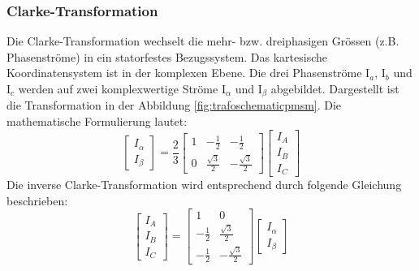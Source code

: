 \subsubsection*{Clarke-Transformation}
Die Clarke-Transformation wechselt die mehr- bzw. dreiphasigen Grössen (z.B. Phasenströme) in ein statorfestes Bezugssystem. Das kartesische Koordinatensystem ist in der komplexen Ebene. Die drei Phasenströme I$_{a}$, I$_{b}$ und I$_{c}$ werden auf zwei komplexwertige Ströme I$_{\alpha}$ und I$_{\beta}$ abgebildet. Dargestellt ist die Transformation in der Abbildung \ref{fig:trafoschematicpmsm}.
Die mathematische Formulierung lautet:
\begin{equation}\label{ClarkeTrafo}
\left[
\begin{array}{c}
I_\alpha \\ 
I_\beta
\end{array} 
\right]
= \frac{2}{3}
\left[
\begin{array}{ccc}
1 & -\frac{1}{2} & -\frac 12 \\ 
0 & \frac{\sqrt{3}}{2} & -\frac{\sqrt{3}}{2}
\end{array} 
\right] 
\left[
\begin{array}{c}
I_A \\ 
I_B \\
I_C
\end{array} 
\right]
\end{equation}
Die inverse Clarke-Transformation wird entsprechend durch folgende Gleichung beschrieben:
\begin{equation}\label{invClarkeTrafo}
\left[
\begin{array}{c}
I_A \\ 
I_B \\
I_C
\end{array} 
\right]
= 
\left[
\begin{array}{cc}
1 & 0 \\
-\frac{1}{2} & \frac{\sqrt{3}}{2} \\
-\frac 12  & -\frac{\sqrt{3}}{2}
\end{array} 
\right] 
\left[
\begin{array}{c}
I_\alpha \\ 
I_\beta
\end{array} 
\right]
\end{equation}



